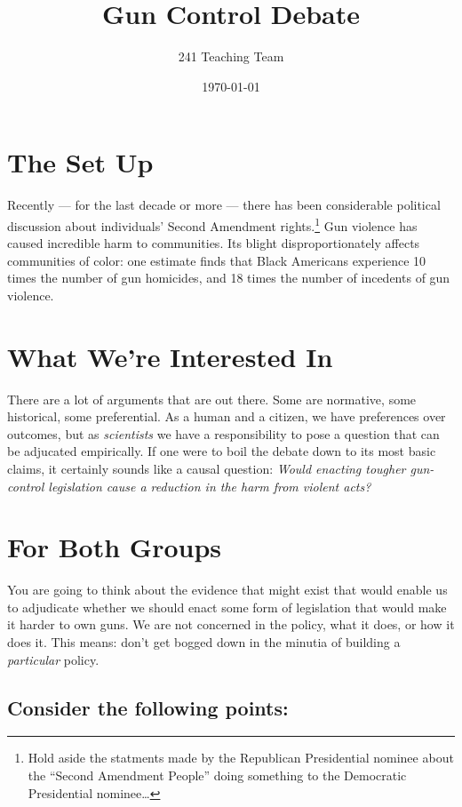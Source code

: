 \documentclass{article}
\author{241 Teaching Team}
\date{\today}
\title{Gun Control Debate}
\begin{document}
\maketitle
\section{The Set Up}
\label{sec:org566d67d}
Recently --- for the last decade or more --- there has been considerable political discussion about individuals' Second Amendment rights.\footnote{Hold aside the statments made by the Republican Presidential nominee about the ``Second Amendment People'' doing something to the Democratic Presidential nominee\ldots{}} Gun violence has caused incredible harm to communities. Its blight disproportionately affects communities of color: one estimate finds that Black Americans experience 10 times the number of gun homicides, and 18 times the number of incedents of gun violence.

\section{What We're Interested In}
\label{sec:org901ada4}
There are a lot of arguments that are out there. Some are normative, some historical, some preferential. As a human and a citizen, we have preferences over outcomes, but as \emph{scientists} we have a responsibility to pose a question that can be adjucated empirically.
If one were to boil the debate down to its most basic claims, it certainly sounds like a causal question: \emph{Would enacting tougher gun-control legislation cause a reduction in the harm from violent acts?}

\section{For Both Groups}
\label{sec:org9b4ffc3}
You are going to think about the evidence that might exist that would enable us to adjudicate whether we should enact some form of legislation that would make it harder to own guns. We are not concerned in the policy, what it does, or how it does it. This means: don't get bogged down in the minutia of building a \emph{particular} policy. 

\subsection{Consider the following points:}
\label{sec:orgba6b8da}
\end{document}
